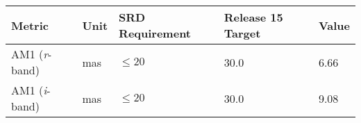 \documentclass[DM,toc]{lsstdoc}
\begin{document}
\begin{longtable}[]{@{}lllll@{}}
\toprule
\begin{minipage}[b]{0.19\columnwidth}\raggedright\strut
Metric\strut
\end{minipage} & \begin{minipage}[b]{0.08\columnwidth}\raggedright\strut
Unit\strut
\end{minipage} & \begin{minipage}[b]{0.20\columnwidth}\raggedright\strut
SRD Requirement\strut
\end{minipage} & \begin{minipage}[b]{0.22\columnwidth}\raggedright\strut
Release 15 Target\strut
\end{minipage} & \begin{minipage}[b]{0.17\columnwidth}\raggedright\strut
Value\strut
\end{minipage}\tabularnewline
\midrule
\endhead
\begin{minipage}[t]{0.19\columnwidth}\raggedright\strut
AM1 (\emph{r}-band)\strut
\end{minipage} & \begin{minipage}[t]{0.08\columnwidth}\raggedright\strut
mas\strut
\end{minipage} & \begin{minipage}[t]{0.20\columnwidth}\raggedright\strut
\(\leq 20\)\strut
\end{minipage} & \begin{minipage}[t]{0.22\columnwidth}\raggedright\strut
30.0\strut
\end{minipage} & \begin{minipage}[t]{0.17\columnwidth}\raggedright\strut
6.66\strut
\end{minipage}\tabularnewline
\begin{minipage}[t]{0.19\columnwidth}\raggedright\strut
AM1 (\emph{i}-band)\strut
\end{minipage} & \begin{minipage}[t]{0.08\columnwidth}\raggedright\strut
mas\strut
\end{minipage} & \begin{minipage}[t]{0.20\columnwidth}\raggedright\strut
\(\leq 20\)\strut
\end{minipage} & \begin{minipage}[t]{0.22\columnwidth}\raggedright\strut
30.0\strut
\end{minipage} & \begin{minipage}[t]{0.17\columnwidth}\raggedright\strut
9.08\strut
\end{minipage}\tabularnewline

\end{longtable}
\end{document}
